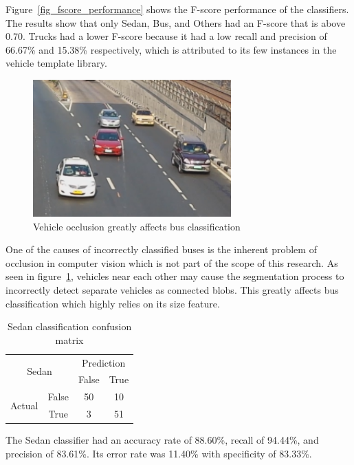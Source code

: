 \documentclass[conference]{IEEEtran}
\begin{document}
Figure~\ref{fig_fscore_performance} shows the F-score performance of the classifiers. The results show that only Sedan, Bus, and Others had an F-score that is above 0.70. Trucks had a lower F-score because it had a low recall and precision of 66.67\% and 15.38\% respectively, which is attributed to its few instances in the vehicle template library. 

\begin{figure}[!ht]
\centering
\includegraphics[width=3in]{occlusion.png}
\caption{Vehicle occlusion greatly affects bus classification}
\label{fig_occlusion}
\end{figure}

One of the causes of incorrectly classified buses is the inherent problem of occlusion in computer vision which is not part of the scope of this research. As seen in figure~\ref{fig_occlusion}, vehicles near each other may cause the segmentation process to incorrectly detect separate vehicles as connected blobs. This greatly affects bus classification which highly relies on its size feature.


\begin{table}[]
\centering
\caption{Sedan classification confusion matrix}
\label{cm:sedan}
\begin{tabular}{|c|c|c|c|}
\hline
\multicolumn{2}{|c|}{\multirow{2}{*}{Sedan}} & \multicolumn{2}{c|}{Prediction} \\ \cline{3-4} 
\multicolumn{2}{|c|}{}                       & False          & True           \\ \hline
\multirow{2}{*}{Actual}         & False      & 50             & 10             \\ \cline{2-4} 
                                & True       &  3             & 51             \\ \hline
\end{tabular}
\end{table}

The Sedan classifier had an accuracy rate of 88.60\%, recall of 94.44\%, and precision of 83.61\%. Its error rate was 11.40\% with specificity of 83.33\%. 
\end{document}
